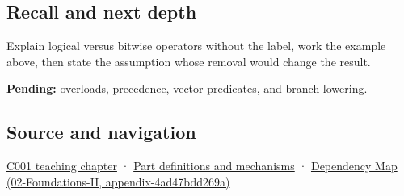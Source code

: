\subsection{Recall and next depth}\label{recall-and-next-depth}

Explain logical versus bitwise operators without the label, work the example above, then state the assumption whose removal would change the result.

\textbf{Pending:} overloads, precedence, vector predicates, and branch lowering.

\subsection{Source and navigation}\label{source-and-navigation}

\href{Continuous\%20Notes/Computing\%20Foundations\%20-\%20From\%20Bits\%20to\%20C++\%20and\%20Systems\%20APIs\#From\%20a\%20signal\%20to\%20an\%20interpretation}{C001 teaching chapter} · \hyperref[appendix-fd090d982a15]{Part definitions and mechanisms} · \href{}{Dependency Map (02-Foundations-II, appendix-4ad47bdd269a)}
